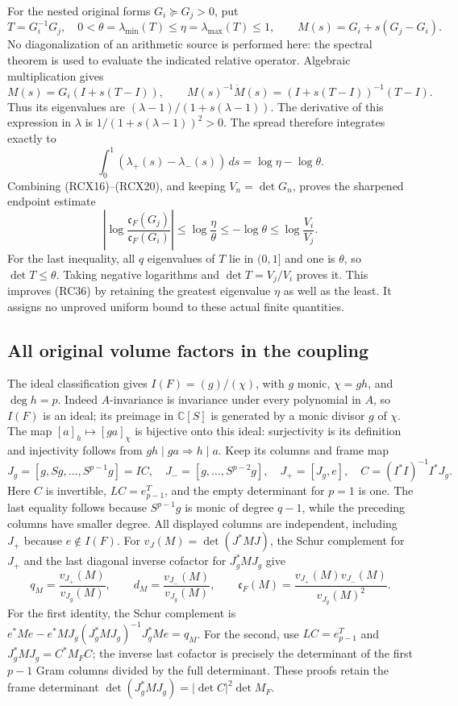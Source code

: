For the nested original forms \(G_i\succeq G_j>0\), put
\[
 T=G_i^{-1}G_j,\quad
 0<\theta=\lambda_{\min}(T)\le
 \eta=\lambda_{\max}(T)\le1,\qquad
 M(s)=G_i+s(G_j-G_i).
 \tag{RCX18}
\]
No diagonalization of an arithmetic source is performed here:
the spectral theorem is used to evaluate the indicated relative
operator. Algebraic multiplication gives
\[
 M(s)=G_i(I+s(T-I)),\qquad
 M(s)^{-1}\dot M(s)=(I+s(T-I))^{-1}(T-I).
 \tag{RCX19}
\]
Thus its eigenvalues are
\((\lambda-1)/(1+s(\lambda-1))\). The derivative of this expression
in \(\lambda\) is \(1/(1+s(\lambda-1))^2>0\).
The spread therefore integrates exactly to
\[
 \int_0^1(\lambda_+(s)-\lambda_-(s))\,ds
   =\log\eta-\log\theta.
 \tag{RCX20}
\]
Combining (RCX16)--(RCX20), and keeping \(V_n=\det G_n\), proves
the sharpened endpoint estimate
\[
 \boxed{
 \left|\log\frac{\mathfrak c_F(G_j)}{\mathfrak c_F(G_i)}\right|
 \le\log\frac{\eta}{\theta}
 \le-\log\theta
 \le\log\frac{V_i}{V_j}.}
 \tag{RCX21}
\]
For the last inequality, all \(q\) eigenvalues of \(T\) lie in
\((0,1]\) and one is \(\theta\), so
\(\det T\le\theta\). Taking negative logarithms and
\(\det T=V_j/V_i\) proves it. This improves (RC36) by retaining
the greatest eigenvalue \(\eta\) as well as the least. It assigns
no unproved uniform bound to these actual finite quantities.

\subsection{All original volume factors in the coupling}

The ideal classification gives \(I(F)=(g)/(\chi)\), with \(g\) monic,
\(\chi=gh\), and \(\deg h=p\). Indeed \(A\)-invariance is invariance
under every polynomial in \(A\), so \(I(F)\) is an ideal; its preimage
in \(\mathbb C[S]\) is generated by a monic divisor \(g\) of \(\chi\).
The map \([a]_h\mapsto[ga]_\chi\) is bijective onto this ideal:
surjectivity is its definition and injectivity follows from
\(gh\mid ga\Rightarrow h\mid a\). Keep its columns and frame map
\[
 J_g=[g,Sg,\ldots,S^{p-1}g]=IC,\quad
 J_-=[g,\ldots,S^{p-2}g],\quad J_+=[J_g,e],\quad
 C=(I^*I)^{-1}I^*J_g.
 \tag{RCX22}
\]
Here \(C\) is invertible, \(LC=e_{p-1}^T\), and the empty
determinant for \(p=1\) is one. The last equality follows because
\(S^{p-1}g\) is monic of degree \(q-1\), while the preceding
columns have smaller degree. All displayed columns are independent,
including \(J_+\) because \(e\notin I(F)\).
For \(v_J(M)=\det(J^*MJ)\), the Schur complement for \(J_+\)
and the last diagonal inverse cofactor for \(J_g^*MJ_g\) give
\[
 q_M=\frac{v_{J_+}(M)}{v_{J_g}(M)},\qquad
 d_M=\frac{v_{J_-}(M)}{v_{J_g}(M)},\qquad
 \mathfrak c_F(M)=
       \frac{v_{J_+}(M)v_{J_-}(M)}{v_{J_g}(M)^2}.
 \tag{RCX23}
\]
For the first identity, the Schur complement is
\(e^*Me-e^*MJ_g(J_g^*MJ_g)^{-1}J_g^*Me=q_M\).
For the second, use \(LC=e_{p-1}^T\) and
\(J_g^*MJ_g=C^*M_FC\); the inverse last cofactor is precisely
the determinant of the first \(p-1\) Gram columns divided by the
full determinant. These proofs retain the frame determinant
\(\det(J_g^*MJ_g)=|\det C|^2\det M_F\).

